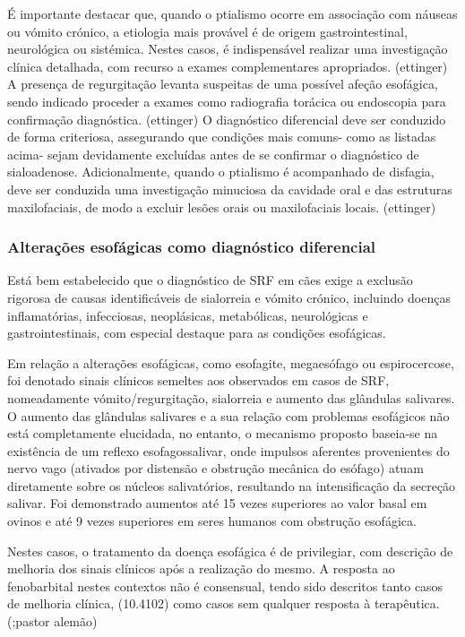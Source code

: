 É importante destacar que, quando o ptialismo ocorre em associação com náuseas ou vómito crónico, a etiologia mais provável é de origem gastrointestinal, neurológica ou sistémica. Nestes casos, é indispensável realizar uma investigação clínica detalhada, com recurso a exames complementares apropriados. (ettinger) 
A presença de regurgitação levanta suspeitas de uma possível afeção esofágica, sendo indicado proceder a exames como radiografia torácica ou endoscopia para confirmação diagnóstica. (ettinger)
O diagnóstico diferencial deve ser conduzido de forma criteriosa, assegurando que condições mais comuns- como as listadas acima- sejam devidamente excluídas antes de se confirmar o diagnóstico de sialoadenose.   
Adicionalmente, quando o ptialismo é acompanhado de disfagia, deve ser conduzida uma investigação minuciosa da cavidade oral e das estruturas maxilofaciais, de modo a excluir lesões orais ou maxilofaciais locais. (ettinger) 

\subsubsection{Alterações esofágicas como diagnóstico diferencial}

Está bem estabelecido que o diagnóstico de SRF em cães exige a exclusão rigorosa de causas identificáveis de sialorreia e vómito crónico, incluindo doenças inflamatórias, infecciosas, neoplásicas, metabólicas, neurológicas e gastrointestinais, com especial destaque para as condições esofágicas. 


Em relação a alterações esofágicas, como esofagite, megaesófago ou espirocercose, foi denotado sinais clínicos semel\cite{Han2016}tes aos observados em casos de SRF, nomeadamente vómito/regurgitação, sialorreia e aumento das glândulas salivares. O aumento das glândulas salivares e a sua relação com problemas esofágicos não está completamente elucidada, no entanto, o mecanismo proposto baseia-se na existência de um reflexo esofagossalivar, onde impulsos aferentes provenientes do nervo vago (ativados por distensão e obstrução mecânica do esófago) atuam diretamente sobre os núcleos salivatórios, resultando na intensificação da secreção salivar. Foi demonstrado aumentos até 15 vezes superiores ao valor basal em ovinos e até 9 vezes superiores em seres humanos com obstrução esofágica.


Nestes casos, o tratamento da doença esofágica é de privilegiar, com descrição de melhoria dos sinais clínicos após a realização do mesmo. A resposta ao fenobarbital nestes contextos não é consensual, tendo sido descritos tanto casos de melhoria clínica, (10.4102) como casos sem qualquer resposta à terapêutica. (\cite{Walton-Clark20221};pastor alemão)

